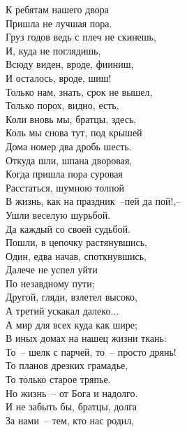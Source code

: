 \scriptsize{
\begin{multicols}{2}
    
    \noindent
    К ребятам нашего двора \\
    Пришла не лучшая пора. \\
    \vfill
    \noindent
    Груз годов ведь с плеч не скинешь,\\
    И, куда не поглядишь,\\
    Всюду виден, вроде, фииниш,\\
    И осталось, вроде, шиш! \\
    \vfill
    \noindent
    Только нам, знать, срок не вышел,\\
    Только порох, видно, есть,\\
    Коли вновь мы, братцы, здесь,\\
    Коль мы снова тут, под крышей\\
    Дома номер два дробь шесть.\\
    \vfill
    \noindent
    Откуда шли, шпана дворовая,\\
    Когда пришла пора суровая\\
    Расстаться, шумною толпой\\
    В жизнь, как на праздник~--пей да пой!,--\\
    Ушли веселую шурьбой.\\
    Да каждый со своей судьбой.\\
    \vfill
    \noindent
    Пошли, в цепочку растянувшись,\\
    Один, едва начав, споткнувшись,\\
    Далече не успел уйти\\
    По незавдному пути;\\
    Другой, гляди, взлетел высоко,\\
    А третий ускакал далеко...\\
    \vfill   
    \noindent 
    А мир для всех куда как шире;\\
    В иных домах на нашец жизни ткань:\\
    То~-- шелк с парчей, то~-- просто дрянь!\\
    То планов дрезких грамадье,\\
    То только старое тряпье.\\
    \vfill
    \noindent
    Но жизнь~-- от Бога и надолго.\\
    И не забыть бы, братцы, долга\\
    За нами~-- тем, кто нас родил,\\

\end{multicols}}
